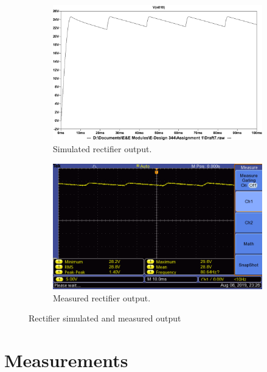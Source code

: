 \begin{figure}[h] 
 \centering
 
    \begin{subfigure}[]{0.5\linewidth}
        \centering
        \includegraphics[width=1.\linewidth]{./Figures/rectifier_simulate.pdf}
        \caption{Simulated rectifier output.}
        \label{fig:rectifier_simulation}
    \end{subfigure}
    \begin{subfigure}[]{0.44\linewidth}
        \centering
        \includegraphics[width=1.\linewidth,clip,trim = 0.3cm 0cm 2.5cm 0cm]{./Figures/rectifier_test}
        \caption{Measured rectifier output.} 
	    \label{fig:rectifier_measurement}
    \end{subfigure}
    
\caption{Rectifier simulated and measured output}
\end{figure}

\section{Measurements} \label{sec:measurements_rectifier}



